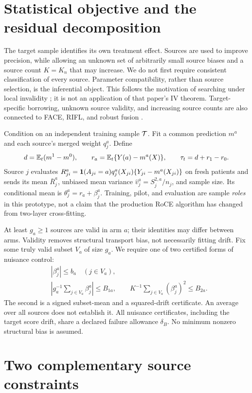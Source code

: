 \section{Statistical objective and the residual decomposition}

The target sample identifies its own treatment effect. Sources are used to
improve precision, while allowing an unknown set of arbitrarily small source
biases and a source count $K=K_n$ that may increase. We do not first require
consistent classification of every source. Parameter compatibility, rather
than source selection, is the inferential object. This follows the motivation
of searching under local invalidity \citep{guo2023}; it is not an application
of that paper's IV theorem. Target-specific borrowing, unknown source validity,
and increasing source counts are also connected to FACE, RIFL, and robust
fusion \citep{face2025,rifl2025,fusion2023}.

Condition on an independent training sample $\mathcal T$. Fit a common prediction
$m^a$ and each source's merged weight $q_j^a$. Define
\[
 d=\mathbb E_t(m^1-m^0),\qquad r_a=\mathbb E_t\{Y(a)-m^a(X)\},\qquad
 \tau_t=d+r_1-r_0.
\]
Source $j$ evaluates $R_{ji}^a=\mathbf 1(A_{ji}=a)q_j^a(X_{ji})\{Y_{ji}-m^a(X_{ji})\}$
on fresh patients and sends its mean $\bar R_j^a$, unbiased mean variance
$\hat v_j^a=S_j^{2,a}/n_j$, and sample size. Its conditional mean is
$\theta_j^a=r_a+\beta_j^a$. Training, pilot, and evaluation are sample
\emph{roles} in this prototype, not a claim that the production RoCE
algorithm has changed from two-layer cross-fitting.

At least $g_a\ge1$ sources are valid in arm $a$; their identities may differ
between arms. Validity removes structural transport bias, not necessarily
fitting drift. Fix some truly valid subset $V_a$ of size $g_a$. We require
one of two certified forms of nuisance control:
\begin{align}
 &|\beta_j^a|\le b_a\quad(j\in V_a),\label{eq:h-uniform}\\
 &\left|g_a^{-1}\sum_{j\in V_a}\beta_j^a\right|\le B_{1a},\qquad
 K^{-1}\sum_{j\in V_a}(\beta_j^a)^2\le B_{2a}.
 \label{eq:h-average}
\end{align}
The second is a signed subset-mean and a squared-drift certificate. An
average over all sources does not establish it. All nuisance certificates,
including the target score drift, share a declared failure allowance
$\delta_B$. No minimum nonzero structural bias is assumed.

\section{Two complementary source constraints}

